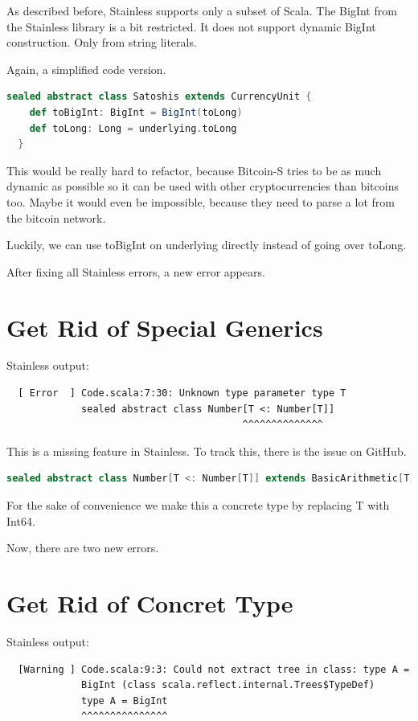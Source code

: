 As described before, Stainless supports only a subset of Scala.
The BigInt from the Stainless library is a bit restricted.
It does not support dynamic BigInt construction.
Only from string literals.

Again, a simplified code version.
\begin{lstlisting}[language=scala]
  sealed abstract class Satoshis extends CurrencyUnit { 
    def toBigInt: BigInt = BigInt(toLong)
    def toLong: Long = underlying.toLong
  }
\end{lstlisting}

This would be really hard to refactor, because Bitcoin-S tries to be as much dynamic as possible so it can be used with other cryptocurrencies than bitcoins too.
Maybe it would even be impossible, because they need to parse a lot from the bitcoin network.

Luckily, we can use toBigInt on underlying directly instead of going over toLong.

After fixing all Stainless errors, a new error appears.


\section{Get Rid of Special Generics}

Stainless output:
{\footnotesize\begin{verbatim}
  [ Error  ] Code.scala:7:30: Unknown type parameter type T
             sealed abstract class Number[T <: Number[T]]
                                         ^^^^^^^^^^^^^^
\end{verbatim}}

This is a missing feature in Stainless.
To track this, there is the issue  on GitHub.
\begin{lstlisting}[language=scala]
  sealed abstract class Number[T <: Number[T]] extends BasicArithmetic[T]  
\end{lstlisting}

For the sake of convenience we make this a concrete type by replacing T with Int64.

Now, there are two new errors.


\section{Get Rid of Concret Type}

Stainless output:
{\footnotesize\begin{verbatim}
  [Warning ] Code.scala:9:3: Could not extract tree in class: type A =
             BigInt (class scala.reflect.internal.Trees$TypeDef)
             type A = BigInt
             ^^^^^^^^^^^^^^^
\end{verbatim}}

